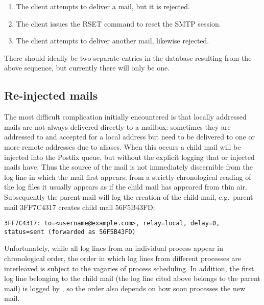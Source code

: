 \begin{enumerate}

    \item The client attempts to deliver a mail, but it is rejected.

    \item The client issues the RSET command to reset the \gls{SMTP}
        session.

    \item The client attempts to deliver another mail, likewise rejected.

\end{enumerate}

There should ideally be two separate entries in the database resulting from
the above sequence, but currently there will only be one.



\subsection{Re-injected mails}

\label{Re-injected mails}

\label{tracking re-injected mail}

The most difficult complication initially encountered is that locally
addressed mails are not always delivered directly to a mailbox: sometimes
they are addressed to and accepted for a local address but need to be
delivered to one or more remote addresses due to aliases.  When this
occurs a child mail will be injected into the Postfix queue, but without
the explicit logging that  or  injected
mails have.  Thus the source of the mail is not immediately discernible
from the log line in which the mail first appears; from a strictly
chronological reading of the log files it usually appears as if the child
mail has appeared from thin air.  Subsequently the parent mail will log the
creation of the child mail, e.g.\ parent mail 3FF7C4317 creates child mail
56F5B43FD\@:

\texttt{3FF7C4317: to=<username@example.com>, relay=local, \newline{}
\tab{} delay=0, status=sent (forwarded as 56F5B43FD)}

Unfortunately, while all log lines from an individual process appear in
chronological order, the order in which log lines from different processes
are interleaved is subject to the vagaries of process scheduling.  In
addition, the first log line belonging to the child mail (the log line
cited above belongs to the parent mail) is logged by , so the
order also depends on how soon  processes the new mail.

